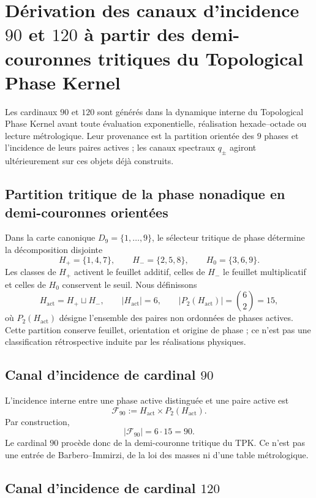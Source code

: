 \section{Dérivation des canaux d'incidence \texorpdfstring{\(90\)}{90} et \texorpdfstring{\(120\)}{120} à partir des demi-couronnes tritiques du Topological Phase Kernel}
\label{sec:sucesor-102-incidencia-tpk-90-120}

Les cardinaux \(90\) et \(120\) sont générés dans la dynamique interne du
Topological Phase Kernel avant toute évaluation exponentielle, réalisation
hexade--octade ou lecture métrologique. Leur provenance est la partition orientée
des \(9\) phases et l'incidence de leurs paires actives ; les canaux
spectraux \(q_\pm\) agiront ultérieurement sur ces objets déjà
construits.

\subsection{Partition tritique de la phase nonadique en demi-couronnes orientées}

Dans la carte canonique \(D_9=\{1,\ldots,9\}\), le sélecteur tritique de phase
détermine la décomposition disjointe
\[
 H_+=\{1,4,7\},\qquad
 H_-=\{2,5,8\},\qquad
 H_0=\{3,6,9\}.
\]
Les classes de \(H_+\) activent le feuillet additif, celles de \(H_-\) le feuillet
multiplicatif et celles de \(H_0\) conservent le seuil. Nous définissons
\[
 H_{\mathrm{act}}=H_+\sqcup H_-,
 \qquad |H_{\mathrm{act}}|=6,
 \qquad \bigl|P_2(H_{\mathrm{act}})\bigr|=\binom62=15,
\]
où \(P_2(H_{\mathrm{act}})\) désigne l'ensemble des paires non ordonnées de
phases actives. Cette partition conserve feuillet, orientation et origine de phase ; ce
n'est pas une classification rétrospective induite par les réalisations physiques.

\subsection{Canal d'incidence de cardinal \texorpdfstring{\(90\)}{90}}

L'incidence interne entre une phase active distinguée et une paire active est
\[
 \mathcal F_{90}
 :=H_{\mathrm{act}}\times P_2(H_{\mathrm{act}}).
\]
Par construction,
\[
 |\mathcal F_{90}|=6\cdot15=90.
\]
Le cardinal \(90\) procède donc de la demi-couronne tritique du TPK. Ce
n'est pas une entrée de Barbero--Immirzi, de la loi des masses ni d'une table
métrologique.

\subsection{Canal d'incidence de cardinal \texorpdfstring{\(120\)}{120}}

